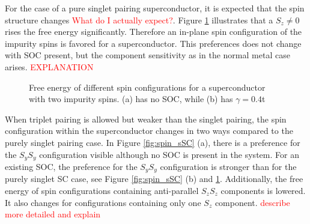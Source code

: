 For the case of a pure singlet pairing superconductor, it is expected that the spin structure changes \cite{SOMEONE SMART} \textcolor{red}{What do I actually expect?}. \newline
Figure \ref{fig:spin_SC} illustrates that a $S_z \neq 0$ rises the free energy significantly. 
Therefore an in-plane spin configuration of the impurity spins is favored for a superconductor. \newline
This preferences does not change with SOC present, but the component sensitivity as in the normal metal case arises.
\textcolor{red}{EXPLANATION}
\begin{figure}[H]
    \centering
    \label{fig:spin_SC}
    \caption{Free energy of different spin configurations for a superconductor with two impurity spins. (a) has no SOC, while (b) has $\gamma=0.4$t }
\end{figure}

When triplet pairing is allowed but weaker than the singlet pairing, the spin configuration within the superconductor changes in two ways compared to the purely singlet pairing case.
In Figure \ref{fig:spin_sSC} (a), there is a preference for the $S_yS_y$ configuration visible although no SOC is present in the system. 
For an existing SOC, the preference for the $S_yS_y$ configuration is stronger than for the purely singlet SC case, see Figure \ref{fig:spin_sSC} (b) and \ref{fig:spin_SC}. \newline
Additionally, the free energy of spin configurations containing anti-parallel $S_zS_z$ components is lowered.
It also changes for configurations containing only one $S_z$ component. 
\textcolor{red}{describe more detailed and explain}

